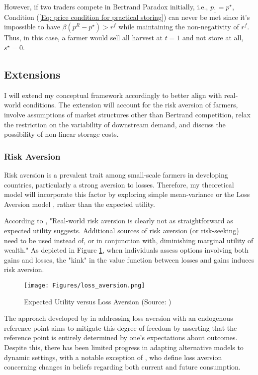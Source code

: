 However, if two traders compete in Bertrand Paradox initially, i.e., $p_1=p^\star$, Condition (\ref{Eq: price condition for practical storing}) can never be met since it's impossible to have $\beta (p^R-p^\star) > r^f$ while maintaining the non-negativity of $r^f$. Thus, in this case, a farmer would sell all harvest at $t=1$ and not store at all, $s^\star=0$. 






\subsection{Extensions}
\noindent I will extend my conceptual framework accordingly to better align with real-world conditions. The extension will account for the risk aversion of farmers, involve assumptions of market structures other than Bertrand competition, relax the restriction on the variability of downstream demand, and discuss the possibility of non-linear storage costs.

\subsubsection{Risk Aversion}
\noindent Risk aversion is a prevalent trait among small-scale farmers in developing countries, particularly a strong aversion to losses. Therefore, my theoretical model will incorporate this factor by exploring simple mean-variance or the Loss Aversion model \citep{kahneman1979prospect}, rather than the expected utility.

According to \cite{o2018modeling}, "Real-world risk aversion is clearly not as straightforward as expected utility suggests. Additional sources of risk aversion (or risk-seeking) need to be used instead of, or in conjunction with, diminishing marginal utility of wealth." As depicted in Figure \ref{fig:Loss Aversion}, when individuals assess options involving both gains and losses, the "kink" in the value function between losses and gains induces risk aversion.

\begin{figure}[thp]
    \centering
    \texttt{[image: Figures/loss\_aversion.png]}
    \caption{Expected Utility versus Loss Aversion (Source: \cite{o2018modeling})}
    \label{fig:Loss Aversion}
\end{figure}

The approach developed by \cite{kHoszegi2006model, kHoszegi2007reference, kHoszegi2009reference} in addressing loss aversion with an endogenous reference point aims to mitigate this degree of freedom by asserting that the reference point is entirely determined by one's expectations about outcomes. Despite this, there has been limited progress in adapting alternative models to dynamic settings, with a notable exception of \cite{kHoszegi2009reference}, who define loss aversion concerning changes in beliefs regarding both current and future consumption.

